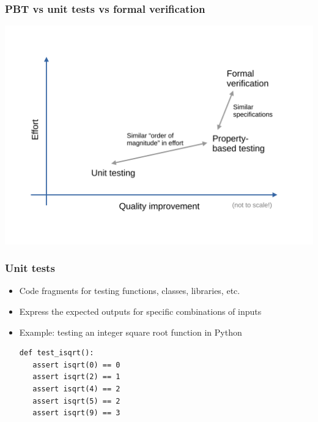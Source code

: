 \documentclass{beamer}
\begin{document}
\begin{frame}[fragile]
  \frametitle{PBT vs unit tests vs formal verification}
  \includegraphics[width=\textwidth]{images/pbt-vs-formal} 
\end{frame}



\begin{frame}[fragile]
  \frametitle{Unit tests}
\begin{itemize}
\item Code fragments for testing functions, classes, libraries, etc.
\item Express the expected outputs for specific combinations of inputs
\item Example: testing an integer square root function in Python
\begin{verbatim}
def test_isqrt():
   assert isqrt(0) == 0
   assert isqrt(2) == 1
   assert isqrt(4) == 2
   assert isqrt(5) == 2
   assert isqrt(9) == 3
\end{verbatim}
\end{itemize}
\end{frame}
\end{document}
